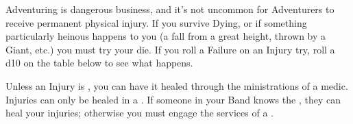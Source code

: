 





Adventuring is dangerous business, and it's not uncommon for Adventurers to receive permanent physical injury. If you survive Dying, or if something particularly heinous happens to you (a fall from a great height, thrown by a Giant, etc.) you must try your \INJURY die. If you roll a Failure on an Injury try, roll a d10 on the table below to see what happens.

Unless an Injury is , you can have it healed through the ministrations of a medic. Injuries can only be healed in a . If someone in your Band knows the , they can heal your injuries; otherwise you must engage the services of a .


